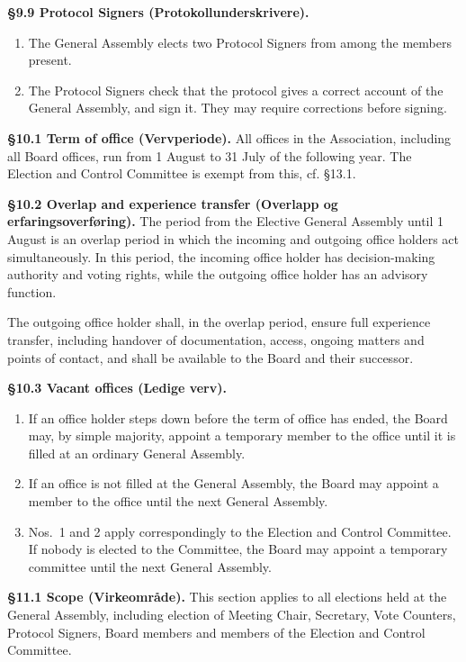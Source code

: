 \documentclass{../../../Common/Latex/Templates/rapport}
\begin{document}
\textbf{\S 9.9 Protocol Signers (Protokollunderskrivere).}
\begin{enumerate}
  \item The General Assembly elects two Protocol Signers from among the members present.
  \item The Protocol Signers check that the protocol gives a correct account of the General Assembly, and sign it. They may require corrections before signing.
\end{enumerate}

\textbf{\S 10.1 Term of office (Vervperiode).} All offices in the Association, including all Board offices, run from 1 August to 31 July of the following year. The Election and Control Committee is exempt from this, cf. \S13.1.

\textbf{\S 10.2 Overlap and experience transfer (Overlapp og erfaringsoverføring).} The period from the Elective General Assembly until 1 August is an overlap period in which the incoming and outgoing office holders act simultaneously. In this period, the incoming office holder has decision-making authority and voting rights, while the outgoing office holder has an advisory function.

The outgoing office holder shall, in the overlap period, ensure full experience transfer, including handover of documentation, access, ongoing matters and points of contact, and shall be available to the Board and their successor.

\textbf{\S 10.3 Vacant offices (Ledige verv).}
\begin{enumerate}
  \item If an office holder steps down before the term of office has ended, the Board may, by simple majority, appoint a temporary member to the office until it is filled at an ordinary General Assembly.
  \item If an office is not filled at the General Assembly, the Board may appoint a member to the office until the next General Assembly.
  \item Nos.\ 1 and 2 apply correspondingly to the Election and Control Committee. If nobody is elected to the Committee, the Board may appoint a temporary committee until the next General Assembly.
\end{enumerate}

\textbf{\S 11.1 Scope (Virkeområde).} This section applies to all elections held at the General Assembly, including election of Meeting Chair, Secretary, Vote Counters, Protocol Signers, Board members and members of the Election and Control Committee.
\end{document}
